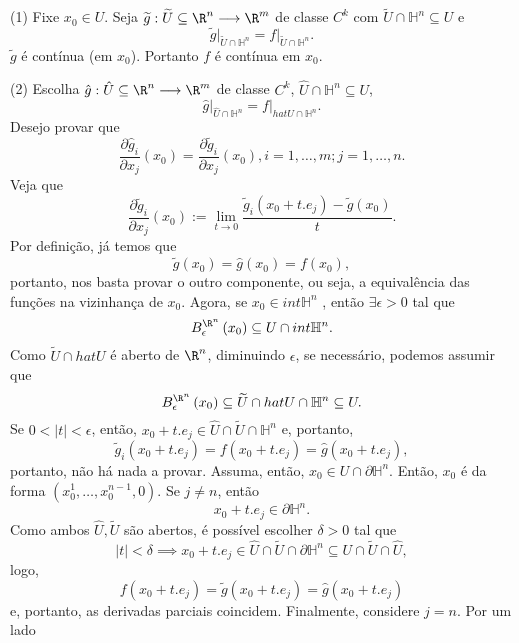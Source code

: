 \begin{demo}
    (1) Fixe $x_0\in U$. Seja $\widetilde{g}: \widetilde{U} \subseteq\R^{n} \longrightarrow \R^{m} $ de classe $C^{k}$ com $\widetilde{U}\cap \mathbb{H}^{n}\subseteq U$ e \[
    \widetilde{g}\Big|_{\widetilde{U}\cap \mathbb{H}^{n}} = f\Big|_{\widetilde{U}\cap \mathbb{H}^{n}}
.\] $\widetilde{g}$ é contínua (em $x_0$). Portanto $f$ é contínua em $x_0$.

    (2) Escolha $\hat{g}: \hat{U}\subseteq\R^{n} \longrightarrow \R^{m}$ de classe $C^{k}$, $\hat{U}\cap \mathbb{H}^{n}\subseteq U$, \[
    \hat{g}\Big|_{\hat{U}\cap \mathbb{H}^{n}} = f\Big|_{hat{U}\cap \mathbb{H}^{n}}
    .\] Desejo provar que \[
    \frac{\partial \hat{g}_i}{\partial x_j} \left( x_0 \right) = \frac{\partial \widetilde{g}_i}{\partial x_j} \left( x_0 \right) , i=1,\ldots,m ; j=1,\ldots,n
    .\] Veja que \[
    \frac{\partial \widetilde{g}_i}{\partial x_j} \left( x_0 \right) := \lim_{t \to 0} \frac{\widetilde{g}_i\left( x_0 + t.e_j\right) -\widetilde{g}\left( x_0 \right)  }{t}
    .\] Por definição, já temos que \[
    \widetilde{g}\left( x_0 \right) = \hat{g}\left( x_0 \right) =f\left( x_0 \right) 
    ,\] portanto, nos basta provar o outro componente, ou seja, a equivalência das funções na vizinhança de $x_0$. Agora, se $x_0\in int \mathbb{H}^{n}$ , então $\exists \epsilon>0$ tal que \[
    B_\epsilon^{\R^{n}}\left( x_0 \right) \subseteq U\cap int \mathbb{H}^{n}
    .\]  Como $\widetilde{U}\cap hat{U}$ é aberto de $\R^{n}$, diminuindo $\epsilon$, se necessário, podemos assumir que \[
    B_\epsilon^{\R^{n}}\left( x_0 \right) \subseteq\widetilde{U}\cap hat{U}\cap \mathbb{H}^{n}\subseteq U
    .\] Se $0<\left| t \right| <\epsilon $, então, $x_0+t.e_j \in \hat{U}\cap \widetilde{U}\cap \mathbb{H}^{n}$ e, portanto, \[
    \widetilde{g}_i\left( x_0+t.e_j \right) = f\left( x_0+t.e_j \right) = \hat{g}\left( x_0 + t.e_j \right) 
    ,\] portanto, não há nada a provar. Assuma, então, $x_0\in U\cap \partial \mathbb{H}^{n}$. Então, $x_0$ é da forma $\left( x_0^{1},\ldots,x_0^{n-1},0 \right) $. Se $j\neq n$, então \[
    x_0+t.e_j \in \partial \mathbb{H}^{n}
    .\] Como ambos $\hat{U}, \widetilde{U}$ são abertos, é possível escolher $\delta > 0$ tal que \[
    \left| t \right| < \delta \implies x_0+ t.e_j\in \hat{U}\cap \widetilde{U}\cap \partial \mathbb{H}^{n} \subseteq U\cap \widetilde{U}\cap \hat{U}
    ,\] logo, \[
    f\left( x_0+t.e_j \right) = \widetilde{g}\left( x_0+t.e_j \right) = \hat{g}\left( x_0+t.e_j \right) 
    \] e, portanto, as derivadas parciais coincidem. Finalmente, considere $j=n$. Por um lado \[
\]
\end{demo}
